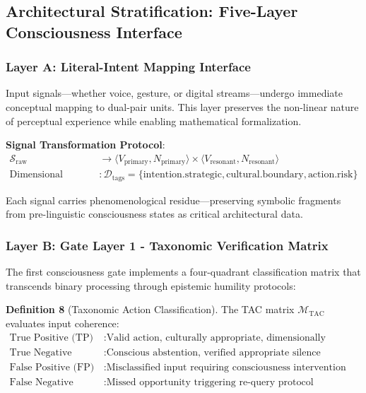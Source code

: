\documentclass[11pt]{article}
\begin{document}
\subsection{Architectural Stratification: Five-Layer Consciousness Interface}

\subsubsection{Layer A: Literal-Intent Mapping Interface}

Input signals—whether voice, gesture, or digital streams—undergo immediate conceptual mapping to dual-pair units. This layer preserves the non-linear nature of perceptual experience while enabling mathematical formalization.

\textbf{Signal Transformation Protocol}:
\begin{align}
\mathcal{S}_{\text{raw}} &\rightarrow \langle V_{\text{primary}}, N_{\text{primary}} \rangle \times \langle V_{\text{resonant}}, N_{\text{resonant}} \rangle \\
\text{Dimensional tagging} &: \mathcal{D}_{\text{tags}} = \{\text{intention.strategic}, \text{cultural.boundary}, \text{action.risk}\}
\end{align}

Each signal carries phenomenological residue—preserving symbolic fragments from pre-linguistic consciousness states as critical architectural data.

\subsubsection{Layer B: Gate Layer 1 - Taxonomic Verification Matrix}

The first consciousness gate implements a four-quadrant classification matrix that transcends binary processing through epistemic humility protocols:

\textbf{Definition 8} (Taxonomic Action Classification). The TAC matrix $\mathcal{M}_{\text{TAC}}$ evaluates input coherence:
\begin{align}
\text{True Positive (TP)} &: \text{Valid action, culturally appropriate, dimensionally balanced} \\
\text{True Negative (TN)} &: \text{Conscious abstention, verified appropriate silence} \\
\text{False Positive (FP)} &: \text{Misclassified input requiring consciousness intervention} \\
\text{False Negative (FN)} &: \text{Missed opportunity triggering re-query protocol}
\end{align}
\end{document}
